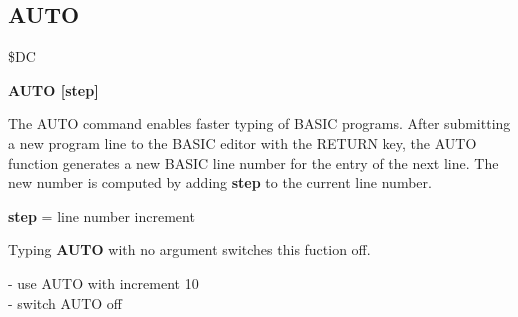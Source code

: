 
\newpage
\subsection{AUTO}
\begin{description}[leftmargin=3cm,style=nextline]
\item [Token:] \$DC
\item [Format:]
  {\bf AUTO [step]}
\item [Usage:] The AUTO command enables faster typing of BASIC programs.
  After submitting a new program line to the BASIC editor with
  the RETURN key, the AUTO function generates a new BASIC line
  number for the entry of the next line. The new number is
  computed by adding {\bf step} to the current line number.

  {\bf step} = line number increment

  Typing {\bf AUTO} with no argument switches this fuction off.

\item [Example:]  - use AUTO with increment 10 \\
                   - switch AUTO off
\end{description}


\newpage

